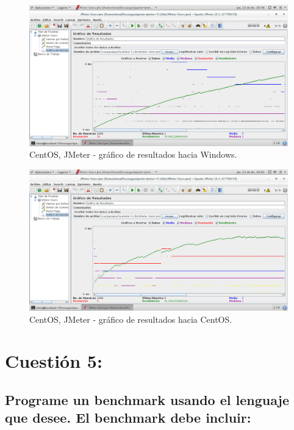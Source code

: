 \begin{figure}[H] 
	\centering
	\includegraphics[width=14.7cm]{./img/ejercicio4_12.png} 	
	\caption{CentOS, JMeter - gráfico de resultados hacia Windows.} \label{fig:ejercicio4_12}
\end{figure}

\begin{figure}[H] 
	\centering
	\includegraphics[width=14.7cm]{./img/ejercicio4_13.png} 	
	\caption{CentOS, JMeter - gráfico de resultados hacia CentOS.} \label{fig:ejercicio4_13}
\end{figure}




\section{Cuestión 5:}
\subsection{Programe un benchmark usando el lenguaje que desee. El benchmark debe incluir:}

